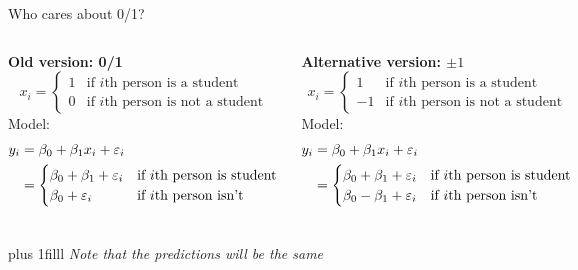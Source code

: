 \documentclass[aspectratio=169,usenames,dvipsnames]{beamer}
\newcommand{\InstructorNotes}[1]{\textit{\color{orange}#1}}
\newcommand{\bvfill}{\vskip0pt plus 1filll}
\begin{document}
\begin{frame}[t]{Who cares about 0/1?}

\begin{columns}
	\textbf{Old version: 0/1}
\begin{equation*}
		x_i =
	\begin{cases}
		1 & \text{if $i$th person is a student}\\
		0 & \text{if $i$th person is not a student}
	\end{cases}
\end{equation*}
Model:
\begin{align*}
y_i &= \beta_0 + \beta_1x_i+\varepsilon_i\\
&= 
	\begin{cases}
		\beta_0 + \beta_1+\varepsilon_i	 & \text{if $i$th person is student}\\
		\beta_0 +\varepsilon_i & \text{if $i$th person isn't}
	\end{cases}
\end{align*}

\textbf{Alternative version: $\pm 1$}
\begin{equation*}
		x_i =
	\begin{cases}
		1 & \text{if $i$th person is a student}\\
		-1 & \text{if $i$th person is not a student}
	\end{cases}
\end{equation*}
Model:
\begin{align*}
y_i &= \beta_0 + \beta_1x_i+\varepsilon_i\\
&= 
	\begin{cases}
		\beta_0 + \beta_1+\varepsilon_i	 & \text{if $i$th person is student}\\
		\beta_0 - \beta_1+\varepsilon_i & \text{if $i$th person isn't}
	\end{cases}
\end{align*}

\end{columns}

\bvfill
\InstructorNotes{Note that the predictions will be the same}
\end{frame}
\end{document}
